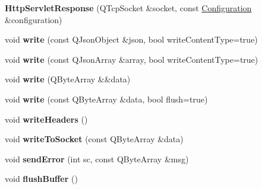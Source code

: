 \begin{DoxyCompactItemize}
\item 
\mbox{\label{class_http_servlet_response_a8136e9aeeb1b1d28db9a4a5932d17cbc}} 
{\bfseries Http\+Servlet\+Response} (Q\+Tcp\+Socket \&socket, const \hyperlink{class_configuration}{Configuration} \&configuration)
\item 
\mbox{\label{class_http_servlet_response_acb16084af55f1541e67a42ba81cb0b08}} 
void {\bfseries write} (const Q\+Json\+Object \&json, bool write\+Content\+Type=true)
\item 
\mbox{\label{class_http_servlet_response_ab0f44bd520ab5187491bce5c07cf3f5b}} 
void {\bfseries write} (const Q\+Json\+Array \&array, bool write\+Content\+Type=true)
\item 
\mbox{\label{class_http_servlet_response_a128d55b31f55938937218632db7aa587}} 
void {\bfseries write} (Q\+Byte\+Array \&\&data)
\item 
\mbox{\label{class_http_servlet_response_ab99b60f65f71d416649f96e9e84c41af}} 
void {\bfseries write} (const Q\+Byte\+Array \&data, bool flush=true)
\item 
\mbox{\label{class_http_servlet_response_a161c99d90e6bd565246bb31784ac71ec}} 
void {\bfseries write\+Headers} ()
\item 
\mbox{\label{class_http_servlet_response_a43db6f1b9c750dd2a66b823291023f3e}} 
void {\bfseries write\+To\+Socket} (const Q\+Byte\+Array \&data)
\item 
\mbox{\label{class_http_servlet_response_a7023895f3b4b730b7a97679bea88466b}} 
void {\bfseries send\+Error} (int sc, const Q\+Byte\+Array \&msg)
\item 
\mbox{\label{class_http_servlet_response_a97cefdfdc34111189c8aef36397c053c}} 
void {\bfseries flush\+Buffer} ()
\item 
\mbox{\label{class_http_servlet_response_a8ffb98c0d0dc7c3808a486f652ba31e7}} 

\end{DoxyCompactItemize}
